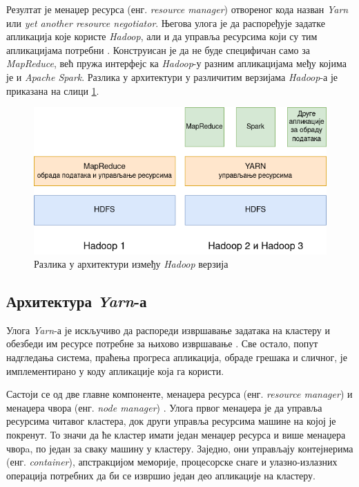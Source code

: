 \documentclass[12pt,oneside]{memoir}
\begin{document}
Резултат је менаџер ресурса (енг. \textit{resource manager}) отвореног кода назван \textit{Yarn} \cite{yarn} или \textit{yet another resource negotiator}. Његова улога је да распоређује задатке апликација које користе \textit{Hadoop}, али и да управља ресурсима који су тим апликацијама потребни  \cite{hadoop_learning}. Конструисан је да не буде специфичан само за \textit{MapReduce}, већ пружа интерфејс ка \textit{Hadoop}-у разним апликацијама међу којима је и \textit{Apache Spark}. Разлика у архитектури у различитим верзијама \textit{Hadoop}-а је приказана на слици \ref{fig:yarn_hadoop_versions}.

\begin{figure}[!ht]
  \centering
  \includegraphics[width=1\textwidth]{pictures/mr_yarn_hadoop_versions.png}
  \caption{Разлика у архитектури између \textit{Hadoop} верзија}
  \label{fig:yarn_hadoop_versions}
\end{figure}

\subsection{Архитектура \textit{Yarn}-а}
\label{subsec:yern_arch}

Улога \textit{Yarn}-а је искључиво да распореди извршавање задатака на кластеру и обезбеди им ресурсе потребне за њихово извршавање \cite{hadoop_learning}. Све остало, попут надгледања система, праћења прогреса апликација, обраде грешака и сличног, је имплементирано у коду апликације која га користи. %

Састоји се од две главне компоненте, менаџера ресурса (енг. \textit{resource manager}) и менаџера чвора (енг. \textit{node manager}) \cite{hadoop_learning}. Улога првог менаџера је да управља ресурсима читавог кластера, док други управља ресурсима машине на којој је покренут. То значи да ће кластер имати један менаџер ресурса и више менаџера чворa, по један за сваку машину у кластеру. Заједно, они управљају контејнерима (енг. \textit{container}), апстракцијом меморије, процесорске снаге и улазно-излазних операција потребних да би се извршио један део апликације на кластеру.
\end{document}
